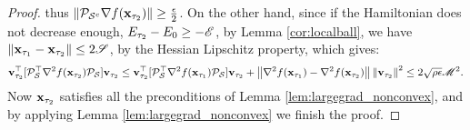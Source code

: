 \begin{proof}
thus $\left\|{\mathcal{P}_{\mathcal{S}^c}\nabla f(\mathbf{x}_{\tau_2})}\right\| \ge \frac{\epsilon}{2}$.
On the other hand, since if the Hamiltonian does not decrease enough, $E_{\tau_2} - E_0 \ge -\mathscr{E}$, 
by Lemma \ref{cor:localball}, we have $\left\|{\mathbf{x}_{\tau_1} - \mathbf{x}_{\tau_2}}\right\| \le 2\mathscr{S}$, by the Hessian Lipschitz property, which gives:
\begin{equation*}
\mathbf{v}_{\tau_2}^{\top} [\mathcal{P}_{\mathcal{S}}^{\top} \nabla^2 f(\mathbf{x}_{\tau_2}) \mathcal{P}_{\mathcal{S}}] \mathbf{v}_{\tau_2} \le 
\mathbf{v}_{\tau_2}^{\top} [\mathcal{P}_{\mathcal{S}}^{\top} \nabla^2 f(\mathbf{x}_{\tau_1}) \mathcal{P}_{\mathcal{S}}] \mathbf{v}_{\tau_2}
+ \left\|{\nabla^2 f(\mathbf{x}_{\tau_1}) - \nabla^2 f(\mathbf{x}_{\tau_2})}\right\|\left\|{\mathbf{v}_{\tau_2}}\right\|^2
\le 2\sqrt{\rho\epsilon}\mathscr{M}^2.
\end{equation*}
Now $\mathbf{x}_{\tau_2}$ satisfies all the preconditions of Lemma \ref{lem:largegrad_nonconvex}, and by applying Lemma \ref{lem:largegrad_nonconvex} we finish the proof.
\end{proof}

